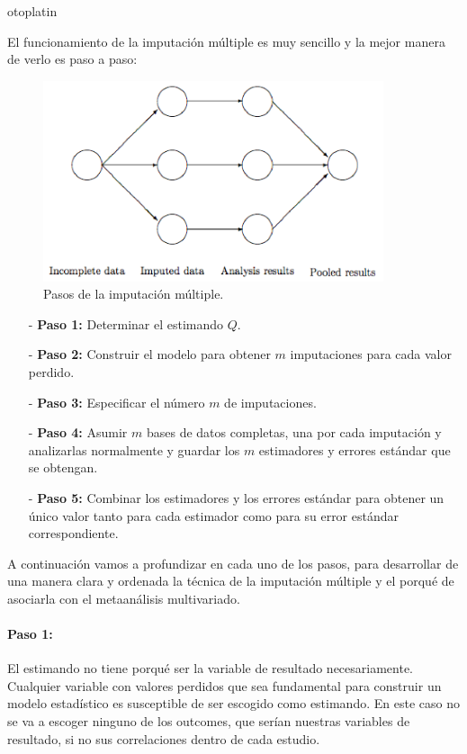 otoplatin\documentclass[a4paper,openright,12pt]{report}
\begin{document}
El funcionamiento de la imputación múltiple es muy sencillo y la mejor manera de verlo es paso a paso:
\medskip 
\begin{figure}[htb]
\begin{center}
\includegraphics[width=10cm]{Imputacion_muliple_imag1}
\caption{Pasos de la imputación múltiple.}
\label{Fig_imputacion_multiple}
\end{center}
\end{figure}
\begin{itemize}
\newpage
\item[-] \textbf{Paso 1:} Determinar el estimando $Q$.
\item[-] \textbf{Paso 2:} Construir el modelo para obtener $m$ imputaciones para cada valor perdido.
\item[-] \textbf{Paso 3:} Especificar el número $m$ de imputaciones.
\item[-] \textbf{Paso 4:} Asumir $m$ bases de datos completas, una por cada imputación y analizarlas normalmente y guardar los $m$ estimadores y errores estándar que se obtengan.
\item[-] \textbf{Paso 5:} Combinar los estimadores y los errores estándar para obtener un único valor tanto para cada estimador como para su error estándar correspondiente.
\end{itemize}

A continuación vamos a profundizar en cada uno de los pasos, para desarrollar de una manera clara y ordenada la técnica de la imputación múltiple y el porqué de asociarla con el metaanálisis multivariado.

\paragraph{Paso 1:}
El estimando no tiene porqué ser la variable de resultado necesariamente. Cualquier variable con valores perdidos que sea fundamental para construir un modelo estadístico es susceptible de ser escogido como estimando. En este caso no se va a escoger ninguno de los outcomes, que serían nuestras variables de resultado, si no sus correlaciones dentro de cada estudio.
\end{document}
